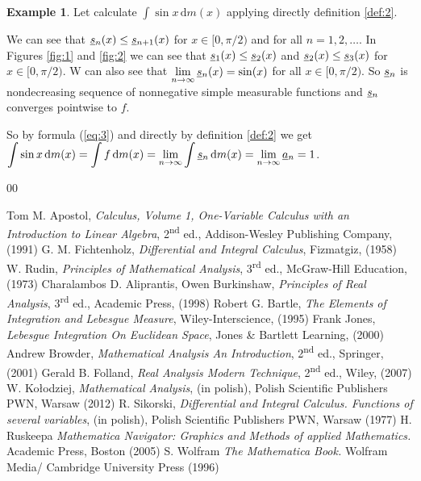 \documentclass[11pt]{article}
\theoremstyle{definition}
\theoremstyle{definition}
\newtheorem*{example}{Example}
\newcommand{\ds}{\displaystyle}
\newcommand{\dx}{\,\mathrm{d}}
\newcommand{\funder}[1]{\underline{#1}\vphantom{#1}}
\begin{document}
\begin{example}
\noindent
Let calculate $\ds \int \sin x \dx m(x)$ applying directly definition \ref{def:2}.

\noindent
We can see that $\ds \funder{s}_n(x)\leq \funder{s}_{n+1}(x)$ for $x\in [0, \pi/2)$ and for all $n=1,2,\ldots$.
In Figures \ref{fig:1} and \ref{fig:2} we can see that $\ds \funder{s}_1(x)\leq \funder{s}_2(x)$ and $\ds \funder{s}_2(x)\leq \funder{s}_3(x)$ for $x\in [0, \pi/2)$.
W can also see that $\ds \lim_{n\to \infty} \funder{s}_n(x)=\sin(x)$ for all $x\in [0, \pi/2)$. So $\ds \funder{s}_n$ is nondecreasing sequence of nonnegative simple measurable functions and  $\ds \funder{s}_n$ converges pointwise to $f$.

\noindent
So by formula (\ref{eq:3}) and directly by definition \ref{def:2} we get $\ds \int \sin x\dx m(x) = \int f\dx m(x) = \lim_{n\to \infty} \int \funder{s}_n \dx m(x)= \lim_{n \to \infty}  \funder{a}_n =1$.



\end{example}

\begin{thebibliography}{00}

\setlength{\itemsep}{-1mm}
\footnotesize
{} Tom M. Apostol, \textit{Calculus, Volume 1, One-Variable Calculus with an Introduction to Linear Algebra}, 2\textsuperscript{nd} ed., Addison-Wesley Publishing Company, (1991)
 G. M. Fichtenholz, \textit{Differential and Integral Calculus}, Fizmatgiz, (1958)
 W. Rudin, \textit{Principles of Mathematical Analysis}, 3\textsuperscript{rd} ed., McGraw-Hill Education, (1973)
  Charalambos D. Aliprantis, Owen Burkinshaw, \textit{Principles of Real Analysis}, 3\textsuperscript{rd} ed., Academic Press,  (1998)
 Robert G. Bartle, \textit{The Elements of Integration and Lebesgue Measure}, Wiley-Interscience, (1995)
 Frank Jones, \textit{Lebesgue Integration On Euclidean Space}, Jones \& Bartlett Learning, (2000)
 Andrew Browder, \textit{Mathematical Analysis An Introduction}, 2\textsuperscript{nd} ed.,  Springer, (2001)
 Gerald B. Folland,  \textit{Real Analysis Modern Technique}, 2\textsuperscript{nd} ed., Wiley, (2007)
 W. Ko{\l}odziej, \textit{Mathematical Analysis}, (in polish), Polish Scientific Publishers PWN, Warsaw (2012)
 R. Sikorski, \textit{Differential and Integral Calculus. Functions of several variables},  (in polish), Polish Scientific Publishers PWN, Warsaw (1977)
 H. Ruskeepa \textit{Mathematica Navigator: Graphics and Methods of applied Mathematics.}
Academic Press, Boston (2005)
S. Wolfram  \textit{The Mathematica Book.} Wolfram Media/ Cambridge University Press (1996)
\end{thebibliography}
\normalsize
\end{document}
